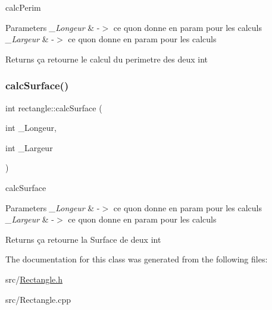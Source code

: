 calc\+Perim 


\begin{DoxyParams}{Parameters}
{\em \+\_\+\+Longeur} & -\/$>$ ce qu\textquotesingle{}on donne en param pour les calculs \\
\hline
{\em \+\_\+\+Largeur} & -\/$>$ ce qu\textquotesingle{}on donne en param pour les calculs \\
\hline
\end{DoxyParams}
\begin{DoxyReturn}{Returns}
ça retourne le calcul du perimetre des deux int 
\end{DoxyReturn}
\mbox{\label{classrectangle_a26f1b435a0ef3f92dbad8c24a7d83d77}} 
\subsubsection{\texorpdfstring{calc\+Surface()}{calcSurface()}}
{\footnotesize\ttfamily int rectangle\+::calc\+Surface (\begin{DoxyParamCaption}\item[{int}]{\+\_\+\+Longeur,  }\item[{int}]{\+\_\+\+Largeur }\end{DoxyParamCaption})}



calc\+Surface 


\begin{DoxyParams}{Parameters}
{\em \+\_\+\+Longeur} & -\/$>$ ce qu\textquotesingle{}on donne en param pour les calculs \\
\hline
{\em \+\_\+\+Largeur} & -\/$>$ ce qu\textquotesingle{}on donne en param pour les calculs \\
\hline
\end{DoxyParams}
\begin{DoxyReturn}{Returns}
ça retourne la Surface de deux int 
\end{DoxyReturn}


The documentation for this class was generated from the following files\+:\begin{DoxyCompactItemize}
\item 
src/\hyperlink{_rectangle_8h}{Rectangle.\+h}\item 
src/Rectangle.\+cpp\end{DoxyCompactItemize}
